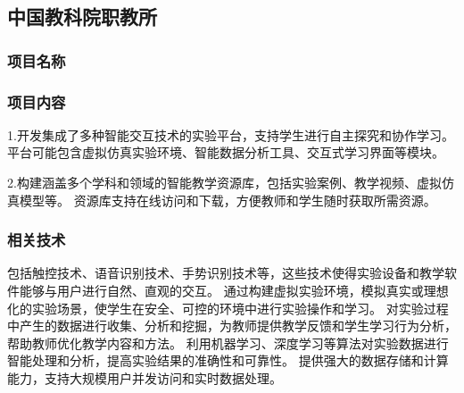 \subsection{中国教科院职教所}


\subsubsection{项目名称}


\subsubsection{项目内容}

1.开发集成了多种智能交互技术的实验平台，支持学生进行自主探究和协作学习。
平台可能包含虚拟仿真实验环境、智能数据分析工具、交互式学习界面等模块。

2.构建涵盖多个学科和领域的智能教学资源库，包括实验案例、教学视频、虚拟仿真模型等。
资源库支持在线访问和下载，方便教师和学生随时获取所需资源。

\subsubsection{相关技术}

包括触控技术、语音识别技术、手势识别技术等，这些技术使得实验设备和教学软件能够与用户进行自然、直观的交互。
通过构建虚拟实验环境，模拟真实或理想化的实验场景，使学生在安全、可控的环境中进行实验操作和学习。
对实验过程中产生的数据进行收集、分析和挖掘，为教师提供教学反馈和学生学习行为分析，帮助教师优化教学内容和方法。
利用机器学习、深度学习等算法对实验数据进行智能处理和分析，提高实验结果的准确性和可靠性。
提供强大的数据存储和计算能力，支持大规模用户并发访问和实时数据处理。

